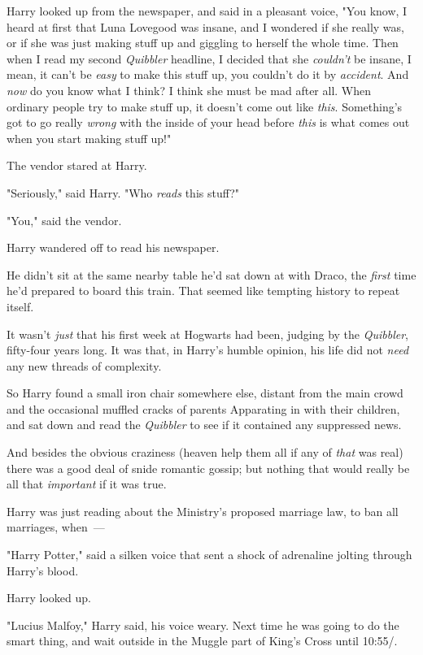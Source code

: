 Harry looked up from the newspaper, and said in a pleasant voice, "You know, I
heard at first that Luna Lovegood was insane, and I wondered if she really was,
or if she was just making stuff up and giggling to herself the whole time. Then
when I read my second \emph{Quibbler} headline, I decided that she
\emph{couldn't} be insane, I mean, it can't be \emph{easy} to make this stuff
up, you couldn't do it by \emph{accident}. And \emph{now} do you know what I
think? I think she must be mad after all. When ordinary people try to make
stuff up, it doesn't come out like \emph{this}. Something's got to go really
\emph{wrong} with the inside of your head before \emph{this} is what comes out
when you start making stuff up!"

The vendor stared at Harry.

"Seriously," said Harry. "Who \emph{reads} this stuff?"

"You," said the vendor.

Harry wandered off to read his newspaper.

He didn't sit at the same nearby table he'd sat down at with Draco, the
\emph{first} time he'd prepared to board this train. That seemed like tempting
history to repeat itself.

It wasn't \emph{just} that his first week at Hogwarts had been, judging by the
\emph{Quibbler}, fifty-four years long. It was that, in Harry's humble opinion,
his life did not \emph{need} any new threads of complexity.

So Harry found a small iron chair somewhere else, distant from the main crowd
and the occasional muffled cracks of parents Apparating in with their children,
and sat down and read the \emph{Quibbler} to see if it contained any suppressed
news.

And besides the obvious craziness (heaven help them all if any of \emph{that}
was real) there was a good deal of snide romantic gossip; but nothing that
would really be all that \emph{important} if it was true.

Harry was just reading about the Ministry's proposed marriage law, to ban all
marriages, when~---

"Harry Potter," said a silken voice that sent a shock of adrenaline jolting
through Harry's blood.

Harry looked up.

"Lucius Malfoy," Harry said, his voice weary. Next time he was going to do the
smart thing, and wait outside in the Muggle part of King's Cross until 10:55\AM/.


